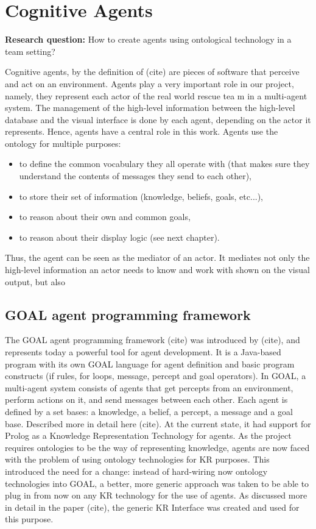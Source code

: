 \section{Cognitive Agents}

\textbf{Research question:} How to create agents using ontological technology in a team setting?

Cognitive agents, by the definition of (cite) are pieces of software that perceive and act on an environment. Agents play a very important role in our project, namely, they represent each actor of the real world rescue tea m in a multi-agent system. The management of the high-level information between the high-level database and the visual interface is done by each agent, depending on the actor it represents. Hence, agents have a central role in this work. Agents use the ontology for multiple purposes: 
\begin{itemize}
\item to define the common vocabulary they all operate with (that makes sure they understand the contents of messages they send to each other),
\item to store their set of information (knowledge, beliefs, goals, etc...), 
\item to reason about their own and common goals,
\item to reason about their display logic (see next chapter).
\end{itemize} 
Thus, the agent can be seen as the mediator of an actor. It mediates not only the high-level information an actor needs to know and work with shown on the visual output, but also 


\subsection{GOAL agent programming framework}

The GOAL agent programming framework (cite) was introduced by (cite), and represents today a powerful tool for agent development. It is a Java-based program with its own GOAL language for agent definition and basic program constructs (if rules, for loops, message, percept and goal operators). 
In GOAL, a multi-agent system consists of agents that get percepts from an environment, perform actions on it, and send messages between each other. Each agent is defined by a set bases: a knowledge, a belief, a percept, a message and a goal base. Described more in detail here (cite).
At the current state, it had support for Prolog as a Knowledge Representation Technology for agents. 
As the project requires ontologies to be the way of representing knowledge, agents are now faced with the problem of using ontology technologies for KR purposes. This introduced the need for a change: instead of hard-wiring now ontology technologies into GOAL, a better, more generic approach was taken to be able to plug in from now on any KR technology for the use of agents. As discussed more in detail in the paper (cite), the generic KR Interface was created and used for this purpose.

